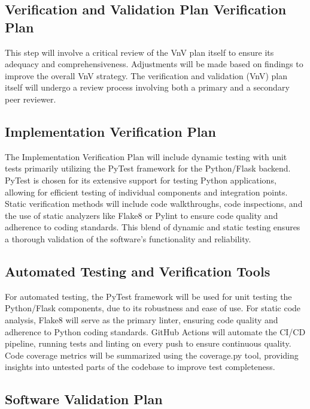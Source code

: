 \documentclass[12pt, titlepage]{article}
\begin{document}
\subsection{Verification and Validation Plan Verification Plan}

This step will involve a critical review of the VnV plan itself to ensure its adequacy 
and comprehensiveness. Adjustments will be made based on findings to improve the overall 
VnV strategy. The verification and validation (VnV) plan itself will undergo a review 
process involving both a primary and a secondary peer reviewer.

\subsection{Implementation Verification Plan}

The Implementation Verification Plan will include dynamic testing with unit tests 
primarily utilizing the PyTest framework for the Python/Flask backend. PyTest is chosen 
for its extensive support for testing Python applications, allowing for efficient testing 
of individual components and integration points. Static verification methods will 
include code walkthroughs, code inspections, and the use of static analyzers like Flake8 
or Pylint to ensure code quality and adherence to coding standards. This blend of dynamic 
and static testing ensures a thorough validation of the software's functionality and 
reliability.

\subsection{Automated Testing and Verification Tools}

For automated testing, the PyTest framework will be used for unit testing the Python/Flask 
components, due to its robustness and ease of use. For static code analysis, Flake8 will 
serve as the primary linter, ensuring code quality and adherence to Python coding 
standards. GitHub Actions will automate the CI/CD pipeline, running tests and linting on 
every push to ensure continuous quality. Code coverage metrics will be summarized using 
the coverage.py tool, providing insights into untested parts of the codebase to improve 
test completeness.

\subsection{Software Validation Plan}
\end{document}
